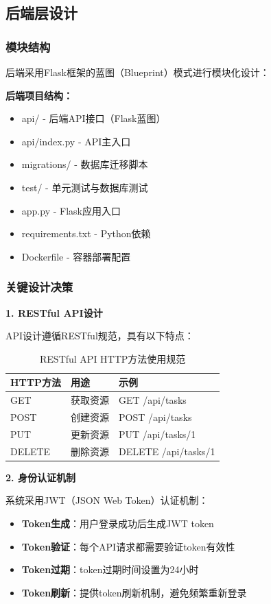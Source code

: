 \documentclass[a4paper]{article}
\begin{document}
\subsection{后端层设计}

\subsubsection{模块结构}

后端采用Flask框架的蓝图（Blueprint）模式进行模块化设计：

\textbf{后端项目结构：}
\begin{itemize}
    \item api/ - 后端API接口（Flask蓝图）
    \item api/index.py - API主入口
    \item migrations/ - 数据库迁移脚本
    \item test/ - 单元测试与数据库测试
    \item app.py - Flask应用入口
    \item requirements.txt - Python依赖
    \item Dockerfile - 容器部署配置
\end{itemize}

\subsubsection{关键设计决策}

\textbf{1. RESTful API设计}

API设计遵循RESTful规范，具有以下特点：

\begin{table}[H]
\centering
\begin{tabular}{|l|l|l|}
\hline
\textbf{HTTP方法} & \textbf{用途} & \textbf{示例} \\
\hline
GET & 获取资源 & GET /api/tasks \\
\hline
POST & 创建资源 & POST /api/tasks \\
\hline
PUT & 更新资源 & PUT /api/tasks/1 \\
\hline
DELETE & 删除资源 & DELETE /api/tasks/1 \\
\hline
\end{tabular}
\caption{RESTful API HTTP方法使用规范}
\end{table}

\textbf{2. 身份认证机制}

系统采用JWT（JSON Web Token）认证机制：

\begin{itemize}
    \item \textbf{Token生成}：用户登录成功后生成JWT token
    \item \textbf{Token验证}：每个API请求都需要验证token有效性
    \item \textbf{Token过期}：token过期时间设置为24小时
    \item \textbf{Token刷新}：提供token刷新机制，避免频繁重新登录
\end{itemize}
\end{document}
